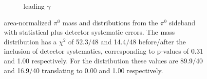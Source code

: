 \begin{figure}[H]
\begin{center}
\begin{subfigure}[b]{0.4\textwidth}
    \caption{\label{fig:detsys:datamc:pi0dedx}leading $\gamma$ \dedx}
    \end{subfigure}
\caption{\label{fig:detsys:datamc:dedx} area-normalized $\pi^0$ mass and \dedx distributions from the $\pi^0$ sideband with statistical plus detector systematic errors. The mass distribution has a $\chi^2$ of 52.3/48 and 14.4/48 before/after the inclusion of detector systematics, corresponding to p-values of 0.31 and 1.00 respectively. For the \dedx distribution these values are 89.9/40 and 16.9/40 translating to 0.00 and 1.00 respectively.}
\end{center}
\end{figure}

